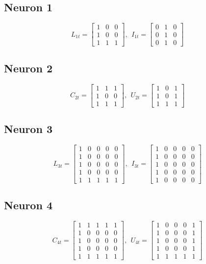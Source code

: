 \documentclass{article}
\begin{document}
	\subsection{Neuron 1}
	\[
	L_{1t} = 
	\begin{bmatrix}
	1 & 0 & 0 \\
	1 & 0 & 0 \\
	1 & 1 & 1
	\end{bmatrix}
	,~~I_{1t} = 
	\begin{bmatrix}
	0 & 1 & 0 \\
	0 & 1 & 0 \\
	0 & 1 & 0
	\end{bmatrix}
	\]
	\subsection{Neuron 2}
	\[
	C_{2t} = 
	\begin{bmatrix}
	1 & 1 & 1 \\
	1 & 0 & 0 \\
	1 & 1 & 1
	\end{bmatrix}
	,~~U_{2t} = 
	\begin{bmatrix}
	1 & 0 & 1 \\
	1 & 0 & 1 \\
	1 & 1 & 1
	\end{bmatrix}
	\]
	\subsection{Neuron 3}
	\[
	L_{3t} = 
	\begin{bmatrix}
	1 & 0 & 0 & 0 & 0 \\
	1 & 0 & 0 & 0 & 0 \\
	1 & 0 & 0 & 0 & 0 \\
	1 & 0 & 0 & 0 & 0 \\
	1 & 1 & 1 & 1 & 1
	\end{bmatrix}
	,~~I_{3t} = 
	\begin{bmatrix}
	1 & 0 & 0 & 0 & 0 \\
	1 & 0 & 0 & 0 & 0 \\
	1 & 0 & 0 & 0 & 0 \\
	1 & 0 & 0 & 0 & 0 \\
	1 & 0 & 0 & 0 & 0
	\end{bmatrix}
	\]
	\subsection{Neuron 4}
	\[
	C_{4t} = 
	\begin{bmatrix}
	1 & 1 & 1 & 1 & 1 \\
	1 & 0 & 0 & 0 & 0 \\
	1 & 0 & 0 & 0 & 0 \\
	1 & 0 & 0 & 0 & 0 \\
	1 & 1 & 1 & 1 & 1
	\end{bmatrix}
	,~~U_{4t} = 
	\begin{bmatrix}
	1 & 0 & 0 & 0 & 1 \\
	1 & 0 & 0 & 0 & 1 \\
	1 & 0 & 0 & 0 & 1 \\
	1 & 0 & 0 & 0 & 1 \\
	1 & 1 & 1 & 1 & 1
	\end{bmatrix}
	\]
	
\end{document}
